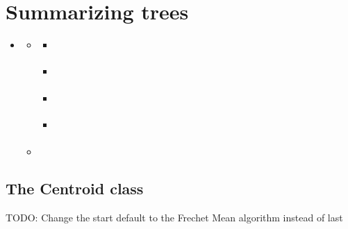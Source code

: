 \documentclass[letterpaper,10pt,english]{sphinxmanual}
\begin{document}
\chapter{Summarizing trees}
\label{\detokenize{summary:summarizing-trees}}\label{\detokenize{summary::doc}}
\begin{sphinxShadowBox}
\begin{itemize}
\item {} 
\sphinxAtStartPar
{}\label{\detokenize{summary:id1}}{\hyperref[\detokenize{summary:summarizing-trees}]{}}
\begin{itemize}
\item {} 
\sphinxAtStartPar
{}\label{\detokenize{summary:id2}}{\hyperref[\detokenize{summary:the-centroid-class}]{}}
\begin{itemize}
\item {} 
\sphinxAtStartPar
{}\label{\detokenize{summary:id3}}{\hyperref[\detokenize{summary:centroid-attributes}]{}}

\item {} 
\sphinxAtStartPar
{}\label{\detokenize{summary:id4}}{\hyperref[\detokenize{summary:centroid-variations}]{}}

\item {} 
\sphinxAtStartPar
{}\label{\detokenize{summary:id5}}{\hyperref[\detokenize{summary:computing-the-sos}]{}}

\item {} 
\sphinxAtStartPar
{}\label{\detokenize{summary:id6}}{\hyperref[\detokenize{summary:sampling-the-neighbourhood}]{}}

\end{itemize}

\item {} 
\sphinxAtStartPar
{}\label{\detokenize{summary:id7}}{\hyperref[\detokenize{summary:frechet-mean}]{}}

\end{itemize}

\end{itemize}
\end{sphinxShadowBox}


\section{The Centroid class}
\label{\detokenize{summary:the-centroid-class}}
\sphinxAtStartPar
TODO: Change the start default to the Frechet Mean algorithm instead of last
\end{document}
